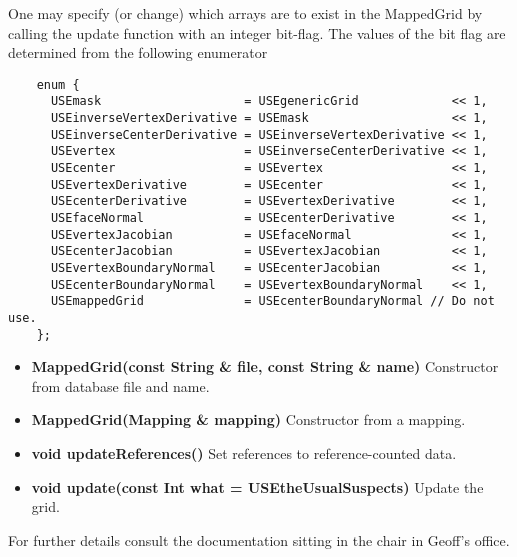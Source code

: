 One may specify (or change) which arrays are to exist in the {\ff MappedGrid}
by calling the {\ff update} function with an integer bit-flag.
The values of the bit flag are determined from the following
enumerator
{\footnotesize
\begin{verbatim}
    enum {
      USEmask                    = USEgenericGrid             << 1,
      USEinverseVertexDerivative = USEmask                    << 1,
      USEinverseCenterDerivative = USEinverseVertexDerivative << 1,
      USEvertex                  = USEinverseCenterDerivative << 1,
      USEcenter                  = USEvertex                  << 1,
      USEvertexDerivative        = USEcenter                  << 1,
      USEcenterDerivative        = USEvertexDerivative        << 1,
      USEfaceNormal              = USEcenterDerivative        << 1,
      USEvertexJacobian          = USEfaceNormal              << 1,
      USEcenterJacobian          = USEvertexJacobian          << 1,
      USEvertexBoundaryNormal    = USEcenterJacobian          << 1,
      USEcenterBoundaryNormal    = USEvertexBoundaryNormal    << 1,
      USEmappedGrid              = USEcenterBoundaryNormal // Do not use.
    };
\end{verbatim}
}

\begin{itemize}
\item{\bf MappedGrid(const String \& file, const String \& name)} Constructor from database file and name.
\item{\bf MappedGrid(Mapping \& mapping)}  Constructor from a mapping.
\item{\bf void updateReferences()} Set references to reference-counted data.
\item{\bf void update(const Int what = USEtheUsualSuspects)} Update the grid.
\end{itemize}

For further details consult the documentation sitting in the chair in Geoff's office.